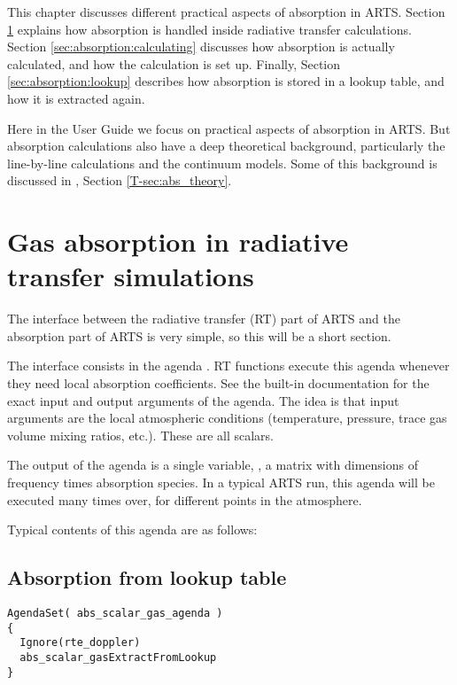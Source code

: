 This chapter discusses different practical aspects of absorption in
ARTS. Section \ref{sec:absorption:abs-rt} explains how absorption is
handled inside radiative transfer calculations.  Section
\ref{sec:absorption:calculating} discusses how absorption is actually
calculated, and how the calculation is set up.  Finally, Section
\ref{sec:absorption:lookup} describes how absorption is stored in a
lookup table, and how it is extracted again.

Here in the User Guide we focus on practical aspects of absorption in
ARTS.  But absorption calculations also have a deep theoretical
background, particularly the line-by-line calculations and the
continuum models.  Some of this background is discussed in \theory,
Section \ref{T-sec:abs_theory}. 

\section{Gas absorption in radiative transfer simulations}
\label{sec:absorption:abs-rt}

The interface between the radiative transfer (RT) part of ARTS and the
absorption part of ARTS is very simple, so this will be a short
section.

The interface consists in the agenda
.  RT functions execute this agenda
whenever they need local absorption coefficients.  See the built-in
documentation for the exact input and output arguments of the agenda.
The idea is that input arguments are the local atmospheric conditions
(temperature, pressure, trace gas volume mixing ratios, etc.).  These
are all scalars.

The output of the agenda is a single variable,
, a matrix with dimensions of frequency
times absorption species.  In a typical ARTS run, this agenda will be
executed many times over, for different points in the atmosphere.

Typical contents of this agenda are as follows:

\subsection{Absorption from lookup table}

\begin{lstlisting}
AgendaSet( abs_scalar_gas_agenda )
{
  Ignore(rte_doppler)
  abs_scalar_gasExtractFromLookup
}
\end{lstlisting}

